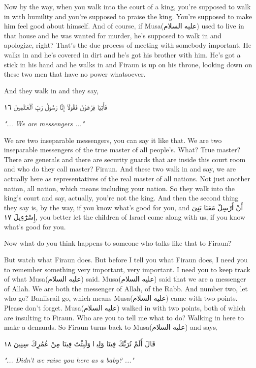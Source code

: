\documentclass[12pt]{article}
\newcommand{\as}{\textarabic{(عليه السلام)}}
\begin{document}
Now by the way, when you walk into the court of a king, you're supposed to walk in with humility and you're supposed to praise the king. You're supposed to make him feel good about himself. And of course, if Musa\as{} used to live in that house and he was wanted for murder, he's supposed to walk in and apologize, right? That's the due process of meeting with somebody important. He walks in and he's covered in dirt and he's got his brother with him. He's got a stick in his hand and he walks in and Firaun is up on his throne, looking down on these two men that have no power whatsoever. 

And they walk in and they say, 

\textarabic{فَأْتِيَا فِرْعَوْنَ فَقُولَآ إِنَّا رَسُولُ رَبِّ ٱلْعَـٰلَمِينَ ١٦} 

\textit{"... We are messengers ..."} 

We are two inseparable messengers, you can say it like that. We are two inseparable messengers of the true master of all people's. What? True master? There are generals and there are security guards that are inside this court room and who do they call master? Firaun. And these two walk in and say, we are actually here as representatives of the real master of all nations. Not just another nation, all nation, which means including your nation. So they walk into the king's court and say, actually, you're not the king. And then the second thing they say is, by the way, if you know what's good for you, and \textarabic{أَنْ أَرْسِلْ مَعَنَا بَنِىٓ إِسْرَٰٓءِيلَ ١٧}, you better let the children of Israel come along with us, if you know what's good for you. 

Now what do you think happens to someone who talks like that to Firaun? 

But watch what Firaun does. But before I tell you what Firaun does, I need you to remember something very important, very important. I need you to keep track of what Musa\as{} said. Musa\as{} said that we are a messenger of Allah. We are both the messenger of Allah, of the Rabb. And number two, let who go? Baniisrail go, which means Musa\as{} came with two points. Please don't forget. Musa\as{} walked in with two points, both of which are insulting to Firaun. Who are you to tell me what to do? Walking in here to make a demands. So Firaun turns back to Musa\as{} and says,

\textarabic{قَالَ أَلَمْ نُرَبِّكَ فِينَا وَلِيدًۭا وَلَبِثْتَ فِينَا مِنْ عُمُرِكَ سِنِينَ ١٨} 

\textit{"... Didn't we raise you here as a baby? ..."} 
\end{document}
